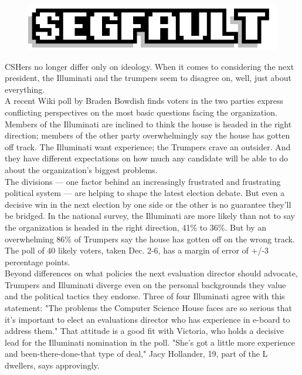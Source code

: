 \documentclass[9pt]{extarticle} %
\begin{document}
\begin{figure}[H]
\centering\vspace{0.5cm}\includegraphics[width=0.8\linewidth]{imgs/segfault.png}
\end{figure}

\hypertarget{Thirdnews}{}

CSHers no longer differ only on ideology. When it comes to considering the next president, the Illuminati and the trumpers seem to disagree on, well, just about everything. \\

A recent Wiki poll by Braden Bowdish finds voters in the two parties express conflicting perspectives on the most basic questions facing the organization. Members of the Illuminati are inclined to think the house is headed in the right direction; members of the other party overwhelmingly say the house has gotten off track. The Illuminati want experience; the Trumpers crave an outsider. And they have different expectations on how much any candidate will be able to do about the organization's biggest problems. \\

The divisions — one factor behind an increasingly frustrated and frustrating political system — are helping to shape the latest election debate. But even a decisive win in the next election by one side or the other is no guarantee they'll be bridged. In the national survey, the Illuminati are more likely than not to say the organization is headed in the right direction, 41\% to 36\%. But by an overwhelming 86\% of Trumpers say the house has gotten off on the wrong track. The poll of 40 likely voters, taken Dec. 2-6, has a margin of error of +/-3 percentage points. \\

Beyond differences on what policies the next evaluation director should advocate, Trumpers and Illuminati diverge even on the personal backgrounds they value and the political tactics they endorse. Three of four Illuminati agree with this statement: "The problems the Computer Science House faces are so serious that it's important to elect an evaluations director who has experience in e-board to address them." That attitude is a good fit with Victoria, who holds a decisive lead for the Illuminati nomination in the poll. "She's got a little more experience and been-there-done-that type of deal," Jacy Hollander, 19, part of the L dwellers, says approvingly. \\
\end{document}
